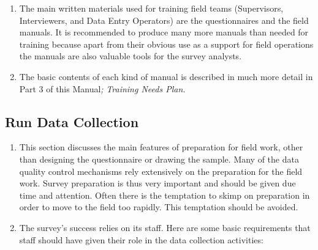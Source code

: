 \documentclass[
]{article}
\begin{document}
\begin{enumerate}
\def\labelenumi{\arabic{enumi}.}
\setcounter{enumi}{341}
\item
  The main written materials used for training field teams
  (Supervisors, Interviewers, and Data Entry Operators) are the
  questionnaires and the field manuals. It is recommended to produce
  many more manuals than needed for training because apart from their
  obvious use as a support for field operations the manuals are also
  valuable tools for the survey analysts.
\item
  The basic contents of each kind of manual is described in much more
  detail in Part 3 of this Manual\emph{;} \emph{Training Needs Plan. }
\end{enumerate}

\hypertarget{run-data-collection}{%
\subsection{Run Data Collection}\label{run-data-collection}}

\begin{enumerate}
\def\labelenumi{\arabic{enumi}.}
\setcounter{enumi}{343}
\item
  This section discusses the main features of preparation for field
  work, other than designing the questionnaire or drawing the sample.
  Many of the data quality control mechanisms rely extensively on the
  preparation for the field work. Survey preparation is thus very
  important and should be given due time and attention. Often there is
  the temptation to skimp on preparation in order to move to the field
  too rapidly. This temptation should be avoided.
\item
  The survey's success relies on its staff. Here are some basic
  requirements that staff should have given their role in the data
  collection activities:
\end{enumerate}
\end{document}
